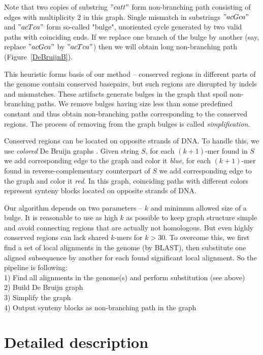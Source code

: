 \documentclass[a4paper,12pt]{scrartcl}
\begin{document}
Note that two copies of substring \("catt"\) form non-branching path consisting of edges with multiplicity \(2\) in this graph. Single
mismatch in substrings \("acGca"\) and \("acTca"\) form so-called "bulge", unoriented cycle generated by two valid paths with
coinciding ends. If we replace one branch of the bulge by another (say, replace \("acGca"\) by \("acTca"\)) then we will obtain
long non-branching path (Figure~\ref{DeBruijnB}).

This heuristic forms basis of our method -- conserved regions in different parts of the genome contain conserved basepairs, but
such regions are disrupted by indels and mismatches. These artifacts generate bulges in the graph that spoil non-branching paths.
We remove bulges having size less than some predefined constant and thus obtain non-branching paths corresponding to the
conserved regions. The process of removing from the graph bulges is called \textit{simplification}.

Conserved regions can be located on opposite strands of DNA. To handle this, we use \textit{colored} De Bruijn graphs \cite{Iqbal2012}.
Given string \(S\), for each \((k + 1)\)-mer found in \(S\) we add corresponding edge to the graph and color it \textit{blue}, for 
each \((k + 1)\)-mer found in reverse-complementary counterpart of \(S\) we add corresponding edge to the graph and color it \textit{red}.
In this graph, coinciding paths with different colors represent synteny blocks located on opposite strands of DNA.

Our algorithm depends on two parameters -- \(k\) and minimum allowed size of a bulge. It is reasonable to use as high \(k\) as possible
to keep graph structure simple and avoid connecting regions that are actually not homologous. But even highly conserved regions can
lack shared \(k\)-mers for \(k > 30\). To overcome this, we first find a set of local alignments in the genome (by BLAST), then substitute
one aligned subsequence by another for each found significant local alignment. So the pipeline is following:\\
1) Find all alignments in the genome(s) and perform substitution (see above) \\
2) Build De Bruijn graph \\
3) Simplify the graph \\
4) Output synteny blocks as non-branching path in the graph 

\section{Detailed description}
\end{document}
